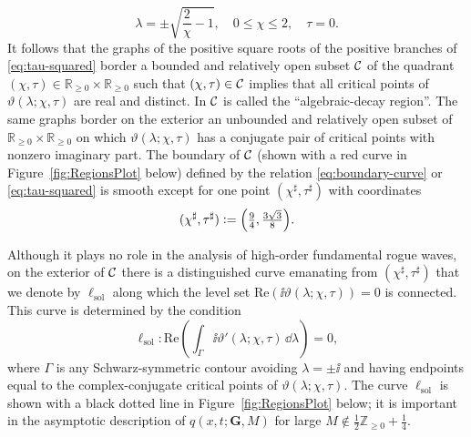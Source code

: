 \begin{equation}
\lambda = \pm\sqrt{\frac{2}{\chi}-1},\quad 0\le\chi\le 2,\quad \tau=0.
\label{eq:tau-zero-critical-points}
\end{equation}
It follows that the graphs of the positive square roots of the positive branches of \eqref{eq:tau-squared} border a bounded and relatively open subset $\mathcal{C}$ of the quadrant $(\chi,\tau)\in\mathbb{R}_{\ge 0}\times\mathbb{R}_{\ge 0}$ such that $(\chi,\tau)\in \mathcal{C}$ implies that all critical points of $\vartheta(\lambda;\chi,\tau)$ are real and distinct.  In \cite{BilmanBW19} $\mathcal{C}$ is called the ``algebraic-decay region''.  The same graphs border on the exterior an unbounded and relatively open subset of $\mathbb{R}_{\ge 0}\times\mathbb{R}_{\ge 0}$ on which $\vartheta(\lambda;\chi,\tau)$ has a conjugate pair of critical points with nonzero imaginary part.  The boundary of $\mathcal{C}$ (shown with a red curve in Figure~\ref{fig:RegionsPlot} below) defined by the relation \eqref{eq:boundary-curve} or \eqref{eq:tau-squared} is smooth except for one point $(\chi^\sharp,\tau^\sharp)$ with coordinates
\begin{equation}
(\chi^\sharp,\tau^\sharp)\defeq\left(\tfrac{9}{4},\tfrac{3\sqrt{3}}{8}\right).
\label{eq:corner-point}
\end{equation}

Although it plays no role in the analysis of high-order fundamental rogue waves, on the exterior of $\mathcal{C}$ there is a distinguished curve emanating from $(\chi^\sharp,\tau^\sharp)$ that we denote by $\ell_\mathrm{sol}$ along which the level set $\mathrm{Re}(\ii\vartheta(\lambda;\chi,\tau))=0$ is connected. This curve is determined by the condition 
\begin{equation}
\ell_\mathrm{sol}:  \mathrm{Re}\left(\int_\Gamma\ii\vartheta'(\lambda;\chi,\tau)\,\dd\lambda\right)=0,
\label{eq:DegenerateBoutroux}
\end{equation}
where $\Gamma$ is any Schwarz-symmetric contour avoiding $\lambda=\pm\ii$ and having endpoints equal to the complex-conjugate critical points of $\vartheta(\lambda;\chi,\tau)$.  The curve $\ell_\mathrm{sol}$ is shown with a black dotted line in Figure~\ref{fig:RegionsPlot} below; it is important in the asymptotic description of $q(x,t;\mathbf{G},M)$ for large $M\not\in \tfrac{1}{2}\mathbb{Z}_{\ge 0}+\tfrac{1}{4}$.

